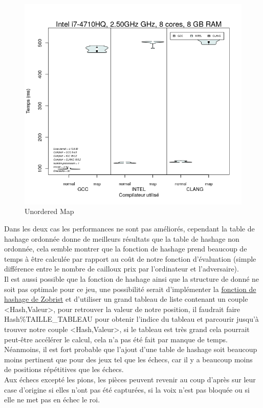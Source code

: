\documentclass[
 aip,
 jmp,
 amsmath,amssymb,
 reprint
]{revtex4-1}
\begin{document}
\begin{figure}[H]
  \includegraphics[width=\linewidth, keepaspectratio=true]{unsorted_map.png}
  \caption{Unordered Map\label{Fig:unsorted_map}}
\end{figure}

Dans les deux cas les performances ne sont pas améliorés, cependant la table de hashage ordonnée donne de meilleurs résultats que la table de hashage non ordonnée, cela semble montrer que la fonction de hashage prend beaucoup de temps à être calculée par rapport au coût de notre fonction d'évaluation (simple différence entre le nombre de cailloux prix par l'ordinateur et l'adversaire).\\
Il est aussi possible que la fonction de hashage ainsi que la structure de donné ne soit pas optimale pour ce jeu, une possibilité serait d'implémenter la \href{https://chessprogramming.wikispaces.com/Zobrist+Hashing}{fonction de hashage de Zobrist} et d'utiliser un grand tableau de liste contenant un couple <Hash,Valeur>, pour retrouver la valeur de notre position, il faudrait faire Hash\%TAILLE\_TABLEAU pour obtenir l'indice du tableau et parcourir jusqu'à trouver notre couple <Hash,Valeur>, si le tableau est très grand cela pourrait peut-être accélérer le calcul, cela n'a pas été fait par manque de temps. Néanmoins, il est fort probable que l'ajout d'une table de hashage soit beaucoup moins pertinent que pour des jeux tel que les échecs, car il y a beaucoup moins de positions répétitives que les échecs.\\
Aux échecs excepté les pions, les pièces peuvent revenir au coup d'après sur leur case d'origine si elles n'ont pas été capturées, si la voix n'est pas bloquée ou si elle ne met pas en échec le roi.
\end{document}
